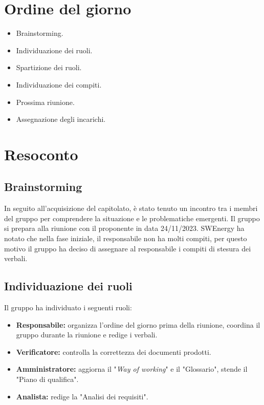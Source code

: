 \section{Ordine del giorno}
\begin{itemize}
	\item Brainstorming.
	\item Individuazione dei ruoli.
	\item Spartizione dei ruoli.
	\item Individuazione dei compiti.
	\item Prossima riunione.
	\item Assegnazione degli incarichi.
\end{itemize}

\section{Resoconto}

\subsection{Brainstorming}
In seguito all'acquisizione del capitolato, è stato tenuto un incontro tra i
membri del gruppo per comprendere la situazione e le problematiche emergenti.
Il gruppo si prepara alla riunione con il proponente in data 24/11/2023.
SWEnergy ha notato che nella fase iniziale, il responsabile non ha molti
compiti, per questo motivo il gruppo ha deciso di assegnare al responsabile
i compiti di stesura dei verbali.

\subsection{Individuazione dei ruoli}
Il gruppo ha individuato i seguenti ruoli:
\begin{itemize}
	\item \textbf{Responsabile:} organizza l'ordine del giorno prima della
	      riunione, coordina il gruppo durante la riunione e redige i verbali.

	\item \textbf{Verificatore:} controlla la correttezza dei documenti prodotti.

	\item \textbf{Amministratore:} aggiorna il "\textit{Way of working}" e il
	      "Glossario", stende il "Piano di qualifica".

	\item \textbf{Analista:} redige la "Analisi dei requisiti".
\end{itemize}

